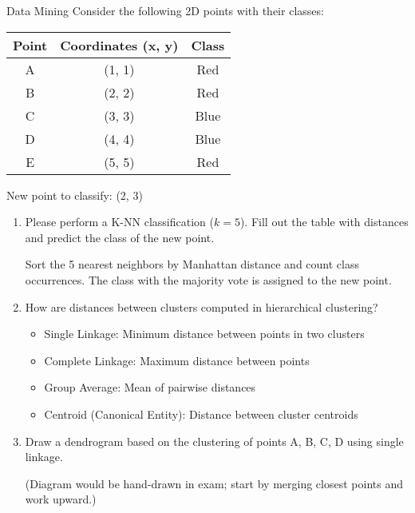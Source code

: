 \documentclass{article}
\begin{document}
\begin{exercise}{Data Mining}
  Consider the following 2D points with their classes:

  \begin{center}
  \begin{tabular}{ccc}
    Point & Coordinates (x, y) & Class \\\hline
    A & (1, 1) & Red \\
    B & (2, 2) & Red \\
    C & (3, 3) & Blue \\
    D & (4, 4) & Blue \\
    E & (5, 5) & Red \\
  \end{tabular}
  \end{center}

  New point to classify: (2, 3)

  \begin{enumerate}
    \item Please perform a K-NN classification ($k=5$). Fill out the table with distances and predict the class of the new point. \begin{solution}
      Sort the 5 nearest neighbors by Manhattan distance and count class occurrences. The class with the majority vote is assigned to the new point.
    \end{solution}

    \item How are distances between clusters computed in hierarchical clustering? \begin{solution}
      \begin{itemize}
        \item Single Linkage: Minimum distance between points in two clusters
        \item Complete Linkage: Maximum distance between points
        \item Group Average: Mean of pairwise distances
        \item Centroid (Canonical Entity): Distance between cluster centroids
      \end{itemize}
    \end{solution}

    \item Draw a dendrogram based on the clustering of points A, B, C, D using single linkage. \begin{solution}
      (Diagram would be hand-drawn in exam; start by merging closest points and work upward.)
    \end{solution}
  \end{enumerate}
\end{exercise}
\end{document}
